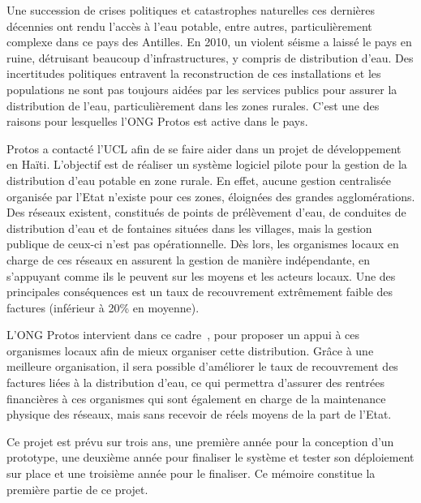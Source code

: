 \documentclass{EPL-master-thesis-covers-FR}
\begin{document}
			Une succession de crises politiques et catastrophes naturelles ces dernières décennies ont rendu l'accès à l'eau potable, entre autres, particulièrement complexe dans ce pays des Antilles. En 2010, un violent séisme a laissé le pays en ruine, détruisant beaucoup d'infrastructures, y compris de distribution d'eau. Des incertitudes politiques entravent la reconstruction de ces installations et les populations ne sont pas toujours aidées par les services publics pour assurer la distribution de l'eau, particulièrement dans les zones rurales. C'est une des raisons pour lesquelles l'ONG Protos est active dans le pays.

			Protos a contacté l'UCL afin de se faire aider dans un projet de développement en Haïti. L'objectif est de réaliser un système logiciel pilote pour la gestion de la distribution d'eau potable en zone rurale. En effet, aucune gestion centralisée organisée par l'Etat n'existe pour ces zones, éloignées des grandes agglomérations. Des réseaux existent, constitués de points de prélèvement d'eau, de conduites de distribution d'eau et de fontaines situées dans les villages, mais la gestion publique de ceux-ci n'est pas opérationnelle. Dès lors, les organismes locaux en charge de ces réseaux en assurent la gestion de manière indépendante, en s'appuyant comme ils le peuvent sur les moyens et les acteurs locaux. Une des principales conséquences est un taux de recouvrement extrêmement faible des factures (inférieur à 20\% en moyenne).

			L'ONG Protos intervient dans ce cadre~\cite{ref:programme_protos}, pour proposer un appui à ces organismes locaux afin de mieux organiser cette distribution. Grâce à une meilleure organisation, il sera possible d'améliorer le taux de recouvrement des factures liées à la distribution d'eau, ce qui permettra d'assurer des rentrées financières à ces organismes qui sont également en charge de la maintenance physique des réseaux, mais sans recevoir de réels moyens de la part de l'Etat.

			Ce projet est prévu sur trois ans, une première année pour la conception d'un prototype, une deuxième année pour finaliser le système et tester son déploiement sur place et une troisième année pour le finaliser. Ce mémoire constitue la première partie de ce projet.
\end{document}

